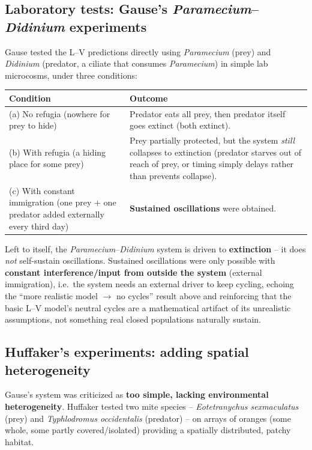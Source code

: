 \documentclass[11pt,a4paper]{article}
\begin{document}
\subsection{Laboratory tests: Gause's \textit{Paramecium}--\textit{Didinium} experiments}
Gause tested the L--V predictions directly using \textit{Paramecium} (prey) and \textit{Didinium} (predator, a ciliate that consumes \textit{Paramecium}) in simple lab microcosms, under three conditions:
\begin{center}
\begin{tabularx}{\textwidth}{@{}l X@{}}
\toprule
\textbf{Condition} & \textbf{Outcome} \\
\midrule
(a) No refugia (nowhere for prey to hide) & Predator eats all prey, then predator itself goes extinct (both extinct). \\
(b) With refugia (a hiding place for some prey) & Prey partially protected, but the system \emph{still} collapses to extinction (predator starves out of reach of prey, or timing simply delays rather than prevents collapse). \\
(c) With constant immigration (one prey $+$ one predator added externally every third day) & \textbf{Sustained oscillations} were obtained. \\
\bottomrule
\end{tabularx}
\end{center}

\begin{keybox}[title=Gause's conclusion]
Left to itself, the \textit{Paramecium}--\textit{Didinium} system is driven to \textbf{extinction} -- it does \emph{not} self-sustain oscillations. Sustained oscillations were only possible with \textbf{constant interference/input from outside the system} (external immigration), i.e.\ the system needs an external driver to keep cycling, echoing the ``more realistic model $\to$ no cycles'' result above and reinforcing that the basic L--V model's neutral cycles are a mathematical artifact of its unrealistic assumptions, not something real closed populations naturally sustain.
\end{keybox}

\subsection{Huffaker's experiments: adding spatial heterogeneity}
Gause's system was criticized as \textbf{too simple, lacking environmental heterogeneity}. Huffaker tested two mite species -- \textit{Eotetranychus sexmaculatus} (prey) and \textit{Typhlodromus occidentalis} (predator) -- on arrays of oranges (some whole, some partly covered/isolated) providing a spatially distributed, patchy habitat.
\end{document}
